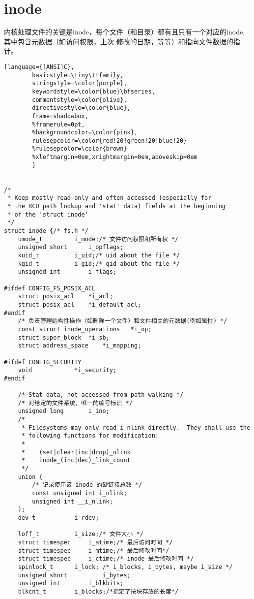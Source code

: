 \section{inode}

内核处理文件的关键是inode，每个文件（和目录）都有且只有一个对应的inode,其中包含元数据（如访问权限，上次
修改的日期，等等）和指向文件数据的指针。

\begin{lstlisting}[language={[ANSI]C},
        basicstyle=\tiny\ttfamily,
        stringstyle=\color{purple},
        keywordstyle=\color{blue}\bfseries,
        commentstyle=\color{olive},
        directivestyle=\color{blue},
        frame=shadowbox,
        %framerule=0pt,
        %backgroundcolor=\color{pink},
        rulesepcolor=\color{red!20!green!20!blue!20}
        %rulesepcolor=\color{brown}
        %xleftmargin=0em,xrightmargin=0em,aboveskip=0em
        ]


/*
 * Keep mostly read-only and often accessed (especially for
 * the RCU path lookup and 'stat' data) fields at the beginning
 * of the 'struct inode'
 */
struct inode {/* fs.h */
	umode_t			i_mode;/* 文件访问权限和所有权 */
	unsigned short		i_opflags;
	kuid_t			i_uid;/* uid about the file */
	kgid_t			i_gid;/* gid about the file */
	unsigned int		i_flags;

#ifdef CONFIG_FS_POSIX_ACL
	struct posix_acl	*i_acl;
	struct posix_acl	*i_default_acl;
#endif
	/* 负责管理结构性操作（如删除一个文件）和文件相关的元数据(例如属性) */
	const struct inode_operations	*i_op;
	struct super_block	*i_sb;
	struct address_space	*i_mapping;

#ifdef CONFIG_SECURITY
	void			*i_security;
#endif

	/* Stat data, not accessed from path walking */
	/* 对给定的文件系统，唯一的编号标识 */
	unsigned long		i_ino;
	/*
	 * Filesystems may only read i_nlink directly.  They shall use the
	 * following functions for modification:
	 *
	 *    (set|clear|inc|drop)_nlink
	 *    inode_(inc|dec)_link_count
	 */
	union {
		/* 记录使用该 inode 的硬链接总数 */
		const unsigned int i_nlink;
		unsigned int __i_nlink;
	};
	dev_t			i_rdev;
	
	loff_t			i_size;/* 文件大小 */
	struct timespec		i_atime;/* 最后访问时间 */
	struct timespec		i_mtime;/* 最后修改时间*/
	struct timespec		i_ctime;/* inode 最后修改时间 */
	spinlock_t		i_lock;	/* i_blocks, i_bytes, maybe i_size */
	unsigned short          i_bytes;
	unsigned int		i_blkbits;
	blkcnt_t		i_blocks;/*指定了按块存放的长度*/


\end{lstlisting}
